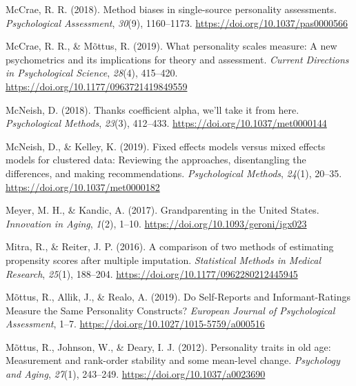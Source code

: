 \documentclass[
  english,
  man, noextraspace]{apa7}
\begin{document}
\leavevmode\hypertarget{ref-mccraeMethodBiasesSinglesource2018}{}%
McCrae, R. R. (2018). Method biases in single-source personality assessments. \emph{Psychological Assessment}, \emph{30}(9), 1160--1173. \url{https://doi.org/10.1037/pas0000566}

\leavevmode\hypertarget{ref-mccraeWhatPersonalityScales2019}{}%
McCrae, R. R., \& Mõttus, R. (2019). What personality scales measure: A new psychometrics and its implications for theory and assessment. \emph{Current Directions in Psychological Science}, \emph{28}(4), 415--420. \url{https://doi.org/10.1177/0963721419849559}

\leavevmode\hypertarget{ref-mcneishThanksCoefficientAlpha2018}{}%
McNeish, D. (2018). Thanks coefficient alpha, we'll take it from here. \emph{Psychological Methods}, \emph{23}(3), 412--433. \url{https://doi.org/10.1037/met0000144}

\leavevmode\hypertarget{ref-mcneishFixedEffectsModels2019}{}%
McNeish, D., \& Kelley, K. (2019). Fixed effects models versus mixed effects models for clustered data: Reviewing the approaches, disentangling the differences, and making recommendations. \emph{Psychological Methods}, \emph{24}(1), 20--35. \url{https://doi.org/10.1037/met0000182}

\leavevmode\hypertarget{ref-meyerGrandparentingUnitedStates2017}{}%
Meyer, M. H., \& Kandic, A. (2017). Grandparenting in the United States. \emph{Innovation in Aging}, \emph{1}(2), 1--10. \url{https://doi.org/10.1093/geroni/igx023}

\leavevmode\hypertarget{ref-mitraComparisonTwoMethods2016}{}%
Mitra, R., \& Reiter, J. P. (2016). A comparison of two methods of estimating propensity scores after multiple imputation. \emph{Statistical Methods in Medical Research}, \emph{25}(1), 188--204. \url{https://doi.org/10.1177/0962280212445945}

\leavevmode\hypertarget{ref-mottusSelfReportsInformantRatingsMeasure2019}{}%
Mõttus, R., Allik, J., \& Realo, A. (2019). Do Self-Reports and Informant-Ratings Measure the Same Personality Constructs? \emph{European Journal of Psychological Assessment}, 1--7. \url{https://doi.org/10.1027/1015-5759/a000516}

\leavevmode\hypertarget{ref-mottusPersonalityTraitsOld2012}{}%
Mõttus, R., Johnson, W., \& Deary, I. J. (2012). Personality traits in old age: Measurement and rank-order stability and some mean-level change. \emph{Psychology and Aging}, \emph{27}(1), 243--249. \url{https://doi.org/10.1037/a0023690}
\end{document}
